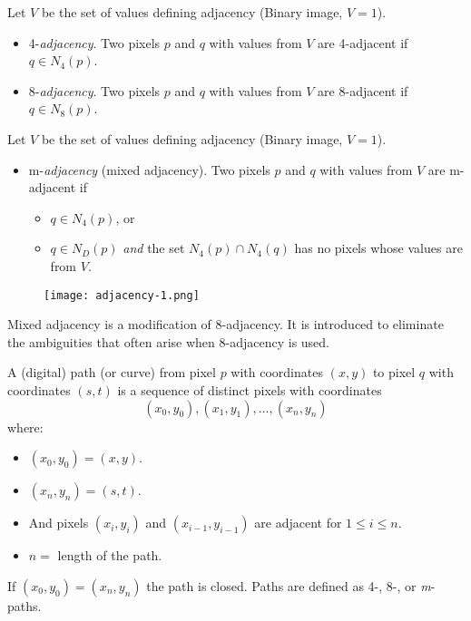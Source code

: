 
\begin{frame}
Let $V$ be the set of values defining adjacency (Binary image, $V={1}$).
\begin{itemize}
\item 4-\textit{adjacency}. Two pixels $p$ and $q$ with values from $V$ are 4-adjacent if $q \in N_{4}(p)$.
\item 8-\textit{adjacency}. Two pixels $p$ and $q$ with values from $V$ are 8-adjacent if $q \in N_{8}(p)$.
\end{itemize}
\end{frame}


\begin{frame}
Let $V$ be the set of values defining adjacency (Binary image, $V={1}$).
\begin{itemize}
\item m-\textit{adjacency} (mixed adjacency). Two pixels $p$ and $q$ with values from $V$ are
m-adjacent if
\begin{itemize}
\item $q\in N_{4}(p)$, or
\item $q\in N_{D}(p)$ \textit{and} the set $N_{4}(p) \cap N_{4}(q)$ has no pixels whose values are from $V$.
\end{itemize}
\end{itemize}
\begin{figure}
\texttt{[image: adjacency-1.png]}
\end{figure}
\end{frame}


\begin{frame}
Mixed adjacency is a modification of 8-adjacency. It is introduced to eliminate the ambiguities that often arise when 8-adjacency is used.
\end{frame}


\begin{frame}
A (digital) path (or curve) from pixel $p$ with coordinates $(x,y)$ to pixel $q$ with coordinates $(s,t)$ is a sequence of distinct pixels with coordinates
\[
(x_{0},y_{0}),(x_{1},y_{1}),\ldots ,(x_{n},y_{n})
\]
where:
\begin{itemize}
\item $(x_{0},y_{0}) = (x,y)$.
\item $(x_{n},y_{n}) = (s,t)$.
\item And pixels $(x_{i}, y_{i})$ and $(x_{i-1}, y_{i-1})$ are adjacent for $1\leq i \leq n$.
\item $n = $ length of the path.
\end{itemize}
If $(x_{0},y_{0}) = (x_{n},y_{n})$ the path is closed.
Paths are defined as 4-, 8-, or \textit{m}- paths.
\end{frame}


